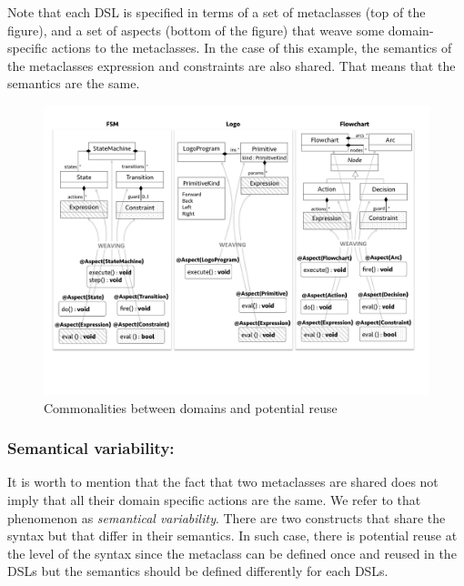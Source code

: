 Note that each DSL is specified in terms of a set of metaclasses (top of the figure), and a set of aspects (bottom of the figure) that weave some domain-specific actions to the metaclasses. In the case of this example, the semantics of the metaclasses expression and constraints are also shared. That means that the semantics are the same. 

\begin{figure}
\centering
\includegraphics[width=1\linewidth]{images/domains-fig.pdf}
\caption{Commonalities between domains and potential reuse}
\label{fig:domains}
\end{figure}


\vspace{-3mm}
\subsubsection{Semantical variability:} It is worth to mention that the fact that two metaclasses are shared does not imply that all their domain specific actions are the same. We refer to that phenomenon as \textit{semantical variability}. There are two constructs that share the syntax but that differ in their semantics. In such case, there is potential reuse at the level of the syntax since the metaclass can be defined once and reused in the DSLs but the semantics should be defined differently for each DSLs. 

